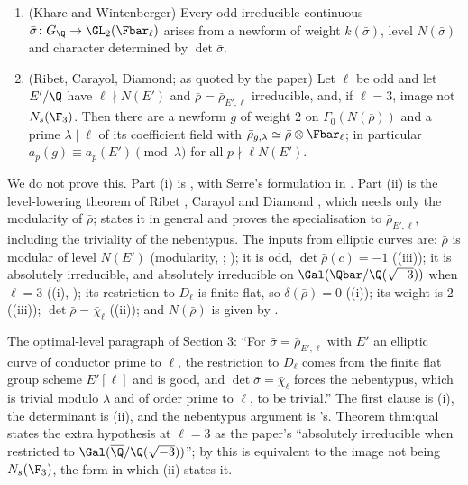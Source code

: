 \begin{theorem}\label{thm:galrep:optimal-level}
\begin{enumerate}[label=(\roman*)]
\item (Khare and Wintenberger) Every odd irreducible continuous $\bar\sigma\colon G_\Q\to\GL_2(\Fbar_\ell)$ arises from a newform of weight $k(\bar\sigma)$, level $N(\bar\sigma)$ and
character determined by $\det\bar\sigma$.
\item (Ribet, Carayol, Diamond; \cite[Theorem 3.15]{DDT} as quoted by the paper) Let $\ell$ be odd and let $E'/\Q$ have $\ell\nmid N(E')$ and $\bar\rho=\bar\rho_{E',\ell}$
irreducible, and, if $\ell=3$, image not $N_s(\F_3)$. Then there are a newform $g$ of weight $2$ on $\Gamma_0(N(\bar\rho))$ and a prime $\lambda\mid\ell$ of its coefficient
field with $\bar\rho_{g,\lambda}\simeq\bar\rho\otimes\Fbar_\ell$; in particular $a_p(g)\equiv a_p(E')\pmod\lambda$ for all $p\nmid\ell N(E')$.
\end{enumerate}
\end{theorem}

We do not prove this. Part (i) is \cite{KhareWintenberger}, with Serre's formulation in \cite{Serre87}. Part (ii) is the level-lowering theorem of
Ribet \cite{Ribet90}, Carayol \cite{Carayol89} and Diamond \cite{Diamond95}, which needs only the modularity of $\bar\rho$;  states it in general and
proves the specialisation to $\bar\rho_{E',\ell}$, including the triviality of the nebentypus. The inputs from elliptic curves are: $\bar\rho$ is modular of level $N(E')$
(modularity, \cite{Wiles95,BCDT}; ); it is odd, $\det\bar\rho(c)=-1$ ((iii)); it is absolutely irreducible, and absolutely
irreducible on $\Gal(\Qbar/\Q(\sqrt{-3}))$ when $\ell=3$ ((i), ); its restriction to $D_\ell$ is finite flat, so $\delta(\bar\rho)=0$
((i)); its weight is $2$ ((iii)); $\det\bar\rho=\bar\chi_\ell$ ((ii)); and $N(\bar\rho)$ is given by
.

\begin{paperlink}
The optimal-level paragraph of Section 3: ``For $\bar\sigma=\bar\rho_{E',\ell}$ with $E'$ an elliptic curve of conductor prime to $\ell$, the restriction to $D_\ell$ comes
from the finite flat group scheme $E'[\ell]$ and is good, and $\det\bar\sigma=\bar\chi_\ell$ forces the nebentypus, which is trivial modulo $\lambda$ and of order
prime to $\ell$, to be trivial.'' The first clause is (i), the determinant is (ii), and the nebentypus
argument is 's. Theorem thm:qual states the extra hypothesis at $\ell=3$ as the paper's ``absolutely irreducible when restricted to
$\Gal(\overline\Q/\Q(\sqrt{-3}))$''; by  this is equivalent to the image not being
$N_s(\F_3)$, the form in which (ii) states it.
\end{paperlink}

